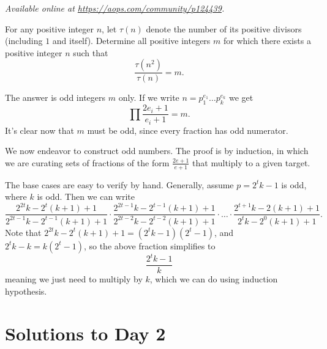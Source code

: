 \textsl{Available online at \url{https://aops.com/community/p124439}.}
\begin{mdframed}[style=mdpurplebox,frametitle={Problem statement}]
For any positive integer $n$,
let $\tau(n)$ denote the number of its positive divisors (including $1$ and itself).
Determine all positive integers $m$ for which
there exists a positive integer $n$ such that
\[ \frac{\tau(n^{2})}{\tau(n)}=m. \]
\end{mdframed}
The answer is odd integers $m$ only.
If we write $n = p_1^{e_1} \dots p_k^{e_k}$ we get
\[ \prod \frac{2e_i+1}{e_i+1} = m. \]
It's clear now that $m$ must be odd,
since every fraction has odd numerator.

We now endeavor to construct odd numbers.
The proof is by induction, in which we are curating sets of
fractions of the form $\frac{2e+1}{e+1}$ that multiply
to a given target.

The base cases are easy to verify by hand.
Generally, assume $p = 2^t k - 1$ is odd, where $k$ is odd.
Then we can write
\[
  \frac{2^{2t}k-2^t(k+1)+1}{2^{2t-1}k-2^{t-1}(k+1)+1}
  \cdot
  \frac{2^{2t-1}k-2^{t-1}(k+1)+1}{2^{2t-2}k-2^{t-2}(k+1)+1}
  \cdot \dots \cdot
  \frac{2^{t+1}k-2(k+1)+1}{2^tk-2^0(k+1)+1}.
\]
Note that $2^{2t}k-2^t(k+1)+1 = (2^t k - 1)(2^t - 1)$,
and $2^t k - k = k(2^t-1)$, so the above fraction simplifies to
\[ \frac{2^t k - 1}{k} \]
meaning we just need to multiply by $k$,
which we can do using induction hypothesis.
\pagebreak

\section{Solutions to Day 2}